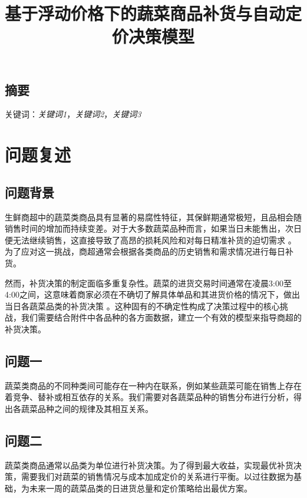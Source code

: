 \documentclass{article}
\title{基于浮动价格下的蔬菜商品补货与自动定价决策模型}
\author{}
\date{}
\begin{document}
\maketitle
\begin{center}
\section*{摘要}
\end{center}


关键词：\textit{关键词1}，\textit{关键词2}，\textit{关键词3}

\section{问题复述}

\subsection{问题背景}

生鲜商超中的蔬菜类商品具有显著的易腐性特征，其保鲜期通常极短，且品相会随销售时间的增加而持续变差。对于大多数蔬菜品种而言，如果当日未能售出，次日便无法继续销售，这直接导致了高昂的损耗风险和对每日精准补货的迫切需求 。为了应对这一挑战，商超通常会根据各类商品的历史销售和需求情况进行每日补货。   

然而，补货决策的制定面临多重复杂性。蔬菜的进货交易时间通常在凌晨3:00至4:00之间，这意味着商家必须在不确切了解具体单品和其进货价格的情况下，做出当日各蔬菜品类的补货决策 。这种固有的不确定性构成了决策过程中的核心挑战，我们需要结合附件中各品种的各方面数据，建立一个有效的模型来指导商超的补货决策。



\subsection{问题一}

蔬菜类商品的不同种类间可能存在一种内在联系，例如某些蔬菜可能在销售上存在着竞争、替补或相互依存的关系。我们需要对各蔬菜品种的销售分布进行分析，得出各蔬菜品种之间的规律及其相互关系。

\subsection{问题二}

蔬菜类商品通常以品类为单位进行补货决策。为了得到最大收益，实现最优补货决策，需要我们对蔬菜的销售情况与成本加成定价的关系进行平衡。以过往数据为基础，为未来一周的蔬菜品类的日进货总量和定价策略给出最优方案。
\end{document}
